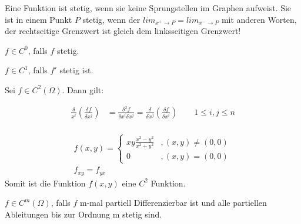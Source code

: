 \documentclass[a4paper]{article}
\begin{document}
	\begin{fdef}[stetig]
		Eine Funktion ist stetig, wenn sie keine Sprungstellen im
		Graphen aufweist. Sie ist in einem Punkt $P$ stetig, wenn der $lim_{x^+\rightarrow P} = lim_{x^-\rightarrow
		P}$ mit anderen Worten, der rechtseitige Grenzwert ist
		gleich dem linksseitigen Grenzwert!
	\end{fdef}

		\begin{multicols}{2}		
		
		\begin{fdef}[$C^0$-Funktionen]
			$f \in C^0$, falls $f$ stetig.
		\end{fdef}		
		
		\begin{fdef}[$C^1$-Funktionen]
			$f \in C^1$, falls $f'$ stetig ist.
		\end{fdef}
		
	\end{multicols}

	\begin{multicols}{2}
		\begin{fdef}[$C^2$-Funktionen]
			Sei $f \in C^2(\Omega)$. Dann gilt:
			
		\begin{align*}
			\frac{\delta}{x^i}\left( \frac{\delta f}{\delta x^j} \right) &= \frac{\delta^2 f}{\delta x^i \delta x^j} = \frac{\delta }{\delta x^j} \left( \frac{\delta f}{\delta x^i} \right) \qquad 1 \leq i,j \leq n \\
		\end{align*}
		\end{fdef} 
		\begin{fmerke}
			\begin{align*}
				f(x,y)= \begin{cases}
							xy \frac{x^2-y^2}{x^2+y^2} &, (x,y) \neq (0,0) \\
							0						 &, (x,y) = (0,0)
						\end{cases} \\
				f_{xy} = f_{yx}
			\end{align*}
			Somit ist die Funktion $f(x,y)$ eine $C^2$ Funktion.
		\end{fmerke}
	\end{multicols}
	\begin{fdef}[$C^m$-Funktionen]
		$f \in C^m(\Omega)$, falls $f$ m-mal partiell Differenzierbar ist und alle partiellen Ableitungen bis zur Ordnung m stetig sind.
	\end{fdef}
			
\end{document}

